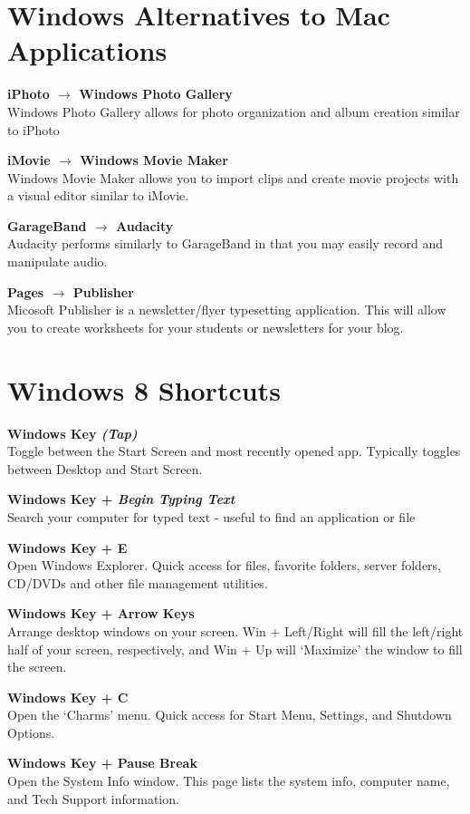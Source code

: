 \documentclass[10pt,foldmark,notumble]{leaflet}
\begin{document}
\section{Windows Alternatives to Mac Applications\color{red}\hrulefill\color{black}}
\textbf{iPhoto $\to$ Windows Photo Gallery}\\
Windows Photo Gallery allows for photo organization and album creation similar to iPhoto

\textbf{iMovie $\to$ Windows Movie Maker}\\
Windows Movie Maker allows you to import clips and create movie projects with a visual editor similar to iMovie.

\textbf{GarageBand $\to$ Audacity}\\
Audacity performs similarly to GarageBand in that you may easily record and manipulate audio.

\textbf{Pages $\to$ Publisher}\\
Micosoft Publisher is a newsletter/flyer typesetting application. This will allow you to create worksheets for your students or newsletters for your blog.

\section{Windows 8 Shortcuts\color{red}\hrulefill\color{black}}
\textbf{Windows Key \emph{(Tap)}}\\
Toggle between the Start Screen and most recently opened app. Typically toggles between Desktop and Start Screen.

\textbf{Windows Key + \emph{Begin Typing Text}}\\
Search your computer for typed text - useful to find an application or file

\textbf{Windows Key + E}\\
Open Windows Explorer. Quick access for files, favorite folders, server folders, CD/DVDs and other file management utilities.

\textbf{Windows Key + Arrow Keys}\\
Arrange desktop windows on your screen. Win + Left/Right will fill the left/right half of your screen, respectively, and Win + Up will `Maximize' the window to fill the screen.

\textbf{Windows Key + C}\\
Open the `Charms' menu. Quick access for Start Menu, Settings, and Shutdown Options.

\textbf{Windows Key + Pause Break}\\
Open the System Info window. This page lists the system info, computer name, and Tech Support information.
\end{document}
